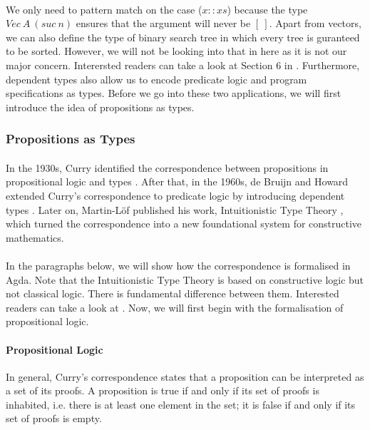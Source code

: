 \paragraph{} We only need to pattern match on the case (\(x
:: xs\)) because the type \(Vec\ A\ (suc\ n)\) ensures that the argument will never
be \([\ ]\). Apart from vectors, we can also define the type of binary
search tree in which every tree is guranteed to be
sorted. However, we will not be looking into that in here as it
is not our major concern. Interersted readers can take a look at 
Section 6 in \cite{bove2009}. Furthermore, dependent types also allow
us to encode predicate logic and program specifications as
types. Before we go into these two applications, we will first
introduce the idea of propositions as types. 


\subsubsection{Propositions as Types}
\paragraph{} In the 1930s, Curry identified the
correspondence between propositions in propositional logic and types
\cite{curry1934}. After that, in the 1960s, de Bruijn and Howard extended
Curry's correspondence to predicate logic by introducing dependent
types \cite{bruijn1968, howard1969}. Later on, Martin-L\"of published
his work, Intuitionistic Type Theory \cite{martin1984}, which turned the correspondence into a new
foundational system for constructive mathematics. 

\paragraph{} In the paragraphs below, we will show how the correspondence is
formalised in Agda. Note that the Intuitionistic Type
Theory is based on constructive logic but not classical logic. There
is fundamental difference between them. Interested readers can take a look at
\cite{avigad2000}. Now, we will first begin with the formalisation of
propositional logic. 

\paragraph{Propositional Logic} In general, Curry's correspondence
states that a proposition can be interpreted as a set of its proofs. A
proposition is true if and only if its set of proofs is inhabited,
i.e. there is at least one element in the set; it is false if and only
if its set of proofs is empty. 

